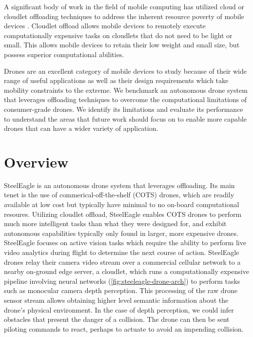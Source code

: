 A significant body of work in the field of mobile computing has utilized cloud
or cloudlet offloading techniques to address the inherent resource poverty of
mobile devices \cite{satya1996,satya2009}. Cloudlet offload allows mobile
devices to remotely execute computationally expensive tasks on cloudlets that
do not need to be light or small. This allows mobile devices to retain their
low weight and small size, but possess superior computational abilities.

Drones are an excellent category of mobile devices to study because of their
wide range of useful applications as well as their design requirements which
take mobility constraints to the extreme.  We benchmark an autonomous drone
system that leverages offloading techniques to overcome the computational
limitations of consumer-grade drones. We identify its limitations and evaluate
its performance to understand the areas that future work should focus on to
enable more capable drones that can have a wider variety of application.

\section{Overview}
\label{sec:overview}

SteelEagle \cite{bala2024} is an autonomous drone system that leverages
offloading.  Its main tenet is the use of commerical-off-the-shelf (COTS)
drones, which are readily available at low cost but typically have minimal to
no on-board computational resoures.  Utilizing cloudlet offload, SteelEagle
enables COTS drones to perform much more intelligent tasks than what they were
designed for, and exhibit autonomous capabilities typically only found in
larger, more expensive drones.  SteelEagle focuses on active vision tasks which
require the ability to perform live video analytics during flight to determine
the next course of action. SteelEagle drones relay their camera video stream
over a commercial cellular network to a nearby on-ground edge server, a
cloudlet, which runs a computationally expensive pipeline involving neural
networks (\cref{fig:steeleagle-drone-arch}) to perform tasks such as monocular
camera depth perception.  This processing of the raw drone sensor stream allows
obtaining higher level semantic information about the drone's physical
environment. In the case of depth perception, we could infer obstacles that
present the danger of a collision. The drone can then be sent piloting commands
to react, perhaps to actuate to avoid an impending collision.

